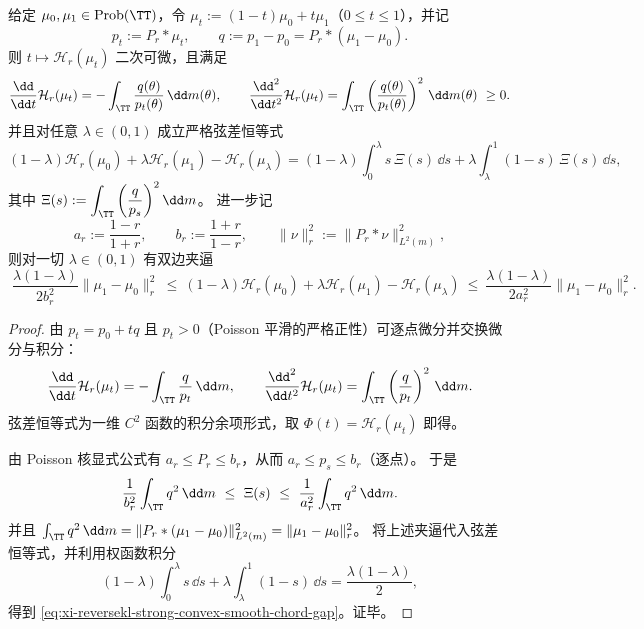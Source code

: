 \begin{theorem}[测度仿射线上的二阶变分与强凸夹逼]\label{thm:xi-reversekl-affine-second-variation-strong-convex}
给定 \(\mu_0,\mu_1\in\mathrm{Prob}(\TT)\)，令 \(\mu_t:=(1-t)\mu_0+t\mu_1\)（\(0\le t\le 1\)），并记
\[
p_t:=P_r*\mu_t,\qquad q:=p_1-p_0=P_r*(\mu_1-\mu_0).
\]
则 \(t\mapsto \mathcal H_r(\mu_t)\) 二次可微，且满足
\[
\frac{\dd}{\dd t}\mathcal H_r(\mu_t)=-\int_{\TT}\frac{q(\theta)}{p_t(\theta)}\,\dd m(\theta),
\qquad
\frac{\dd^2}{\dd t^2}\mathcal H_r(\mu_t)=\int_{\TT}\left(\frac{q(\theta)}{p_t(\theta)}\right)^2\,\dd m(\theta)\ \ge 0.
\]
并且对任意 \(\lambda\in(0,1)\) 成立严格弦差恒等式
\[
(1-\lambda)\mathcal H_r(\mu_0)+\lambda\mathcal H_r(\mu_1)-\mathcal H_r(\mu_\lambda)
=(1-\lambda)\int_0^\lambda s\,\Xi(s)\,\dd s+\lambda\int_\lambda^1(1-s)\,\Xi(s)\,\dd s,
\]
其中 \(\Xi(s):=\displaystyle\int_{\TT}\left(\frac{q}{p_s}\right)^2\dd m\)。
进一步记
\[
a_r:=\frac{1-r}{1+r},\qquad b_r:=\frac{1+r}{1-r},\qquad
\|\nu\|_{r}^2:=\|P_r*\nu\|_{L^2(m)}^2,
\]
则对一切 \(\lambda\in(0,1)\) 有双边夹逼
\begin{equation}\label{eq:xi-reversekl-strong-convex-smooth-chord-gap}
\boxed{\;
\frac{\lambda(1-\lambda)}{2b_r^{2}}\|\mu_1-\mu_0\|_{r}^{2}
\ \le\
(1-\lambda)\mathcal H_r(\mu_0)+\lambda\mathcal H_r(\mu_1)-\mathcal H_r(\mu_\lambda)
\ \le\
\frac{\lambda(1-\lambda)}{2a_r^{2}}\|\mu_1-\mu_0\|_{r}^{2}.
\;}
\end{equation}
\end{theorem}
\begin{proof}
由 \(p_t=p_0+tq\) 且 \(p_t>0\)（Poisson 平滑的严格正性）可逐点微分并交换微分与积分：
\[
\frac{\dd}{\dd t}\mathcal H_r(\mu_t)
=-\int_{\TT}\frac{q}{p_t}\,\dd m,\qquad
\frac{\dd^2}{\dd t^2}\mathcal H_r(\mu_t)
=\int_{\TT}\left(\frac{q}{p_t}\right)^2\,\dd m.
\]
弦差恒等式为一维 \(C^2\) 函数的积分余项形式，取 \(\Phi(t)=\mathcal H_r(\mu_t)\) 即得。
\par
由 Poisson 核显式公式有 \(a_r\le P_r\le b_r\)，从而 \(a_r\le p_s\le b_r\)（逐点）。
于是
\[
\frac{1}{b_r^2}\int_{\TT}q^2\,\dd m\ \le\ \Xi(s)\ \le\ \frac{1}{a_r^2}\int_{\TT}q^2\,\dd m.
\]
并且
\(
\int_{\TT}q^2\,\dd m=\|P_r*(\mu_1-\mu_0)\|_{L^2(m)}^2=\|\mu_1-\mu_0\|_r^2
\)。
将上述夹逼代入弦差恒等式，并利用权函数积分
\[
(1-\lambda)\int_0^\lambda s\,\dd s+\lambda\int_\lambda^1(1-s)\,\dd s=\frac{\lambda(1-\lambda)}{2},
\]
得到 \eqref{eq:xi-reversekl-strong-convex-smooth-chord-gap}。证毕。
\end{proof}

